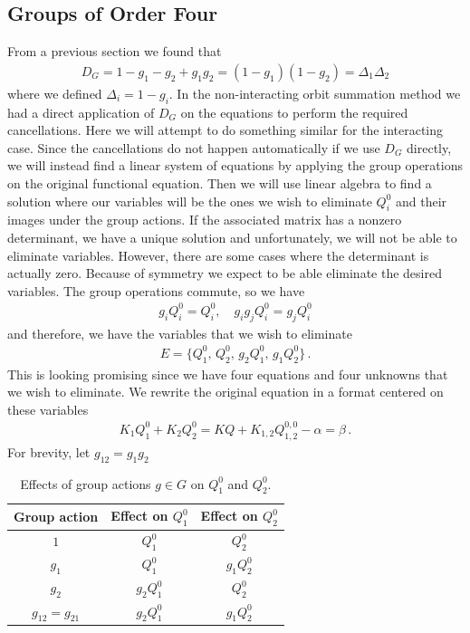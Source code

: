 \subsection{Groups of Order Four}
From a previous section we found that
\begin{align}
	D_G = 1-g_1-g_2+g_1g_2 = (1-g_1)(1-g_2) = \Delta_1\Delta_2
\end{align}
where we defined $\Delta_i = 1- g_i$. In the non-interacting orbit summation method we had a direct application of $D_G$ on the equations to perform the required cancellations. Here we will attempt to do something similar for the interacting case. Since the cancellations do not happen automatically if we use $D_G$ directly, we will instead find a linear system of equations by applying the group operations on the original functional equation. Then we will use linear algebra to find a solution where our variables will be the ones we wish to eliminate $Q_i^0$ and their images under the group actions. If the associated matrix has a nonzero determinant, we have a unique solution and unfortunately, we will not be able to eliminate variables. However, there are some cases where the determinant is actually zero. Because of symmetry we expect to be able eliminate the desired variables. The group operations commute, so we have
\begin{align}
	g_i Q_i^0 = Q_i^0,\quad g_ig_j Q_i^0 = g_j Q_i^0
\end{align}
and therefore, we have the variables that we wish to eliminate
\begin{align}
	E = \{Q_1^0,\,Q_2^0,\,g_2Q_1^0,\,g_1Q_2^0\}\,.
\end{align}
This is looking promising since we have four equations and four unknowns that we wish to eliminate. We rewrite the original equation in a format centered on these variables
\begin{align}
	 K_1 Q_1^0 +  K_2 Q_2^0 = KQ + K_{1,2}Q_{1,2}^{0,0} -\alpha = \beta\,.
\end{align}
For brevity, let $g_{12} = g_1g_2$
\begin{table}[H]
\caption{Effects of group actions $g\in G$ on $Q_1^0$ and $Q_2^0$.}
\label{tbl:actions4}
\centering
\begin{tabular}{ccc}
\toprule
	Group action & Effect on $Q_1^0$ & Effect on $Q_2^0$\\
\midrule
	$1$ & $Q_1^0$ & $Q_2^0$\\
	$g_1$ & $Q_1^0$ & $g_1Q_2^0$ \\
	$g_2$ & $g_2Q_1^0$ & $Q_2^0$ \\
	$g_{12}=g_{21}$ & $g_2Q_1^0$ & $g_1Q_2^0$ \\
\bottomrule
\end{tabular}
\end{table}
